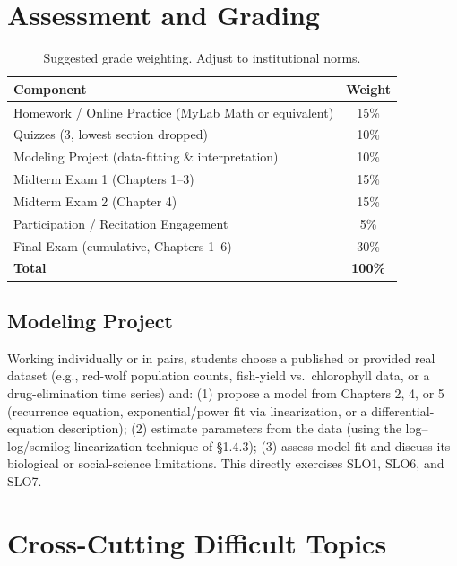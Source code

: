 \documentclass[11pt]{article}
\begin{document}
\section{Assessment and Grading}

\begin{table}[h!]
\centering
\begin{tabular}{lc}
\toprule
\textbf{Component} & \textbf{Weight} \\
\midrule
Homework / Online Practice (MyLab Math or equivalent) & 15\% \\
Quizzes (3, lowest section dropped) & 10\% \\
Modeling Project (data-fitting \& interpretation) & 10\% \\
Midterm Exam 1 (Chapters 1--3) & 15\% \\
Midterm Exam 2 (Chapter 4) & 15\% \\
Participation / Recitation Engagement & 5\% \\
Final Exam (cumulative, Chapters 1--6) & 30\% \\
\midrule
\textbf{Total} & \textbf{100\%} \\
\bottomrule
\end{tabular}
\caption{Suggested grade weighting. Adjust to institutional norms.}
\end{table}

\subsection*{Modeling Project}
Working individually or in pairs, students choose a published or provided real dataset
(e.g., red-wolf population counts, fish-yield vs.\ chlorophyll data, or a drug-elimination
time series) and: (1) propose a model from Chapters 2, 4, or 5 (recurrence equation,
exponential/power fit via linearization, or a differential-equation description); (2)
estimate parameters from the data (using the log--log/semilog linearization technique of
\S1.4.3); (3) assess model fit and discuss its biological or social-science limitations.
This directly exercises SLO1, SLO6, and SLO7.

\section{Cross-Cutting Difficult Topics}
\end{document}
